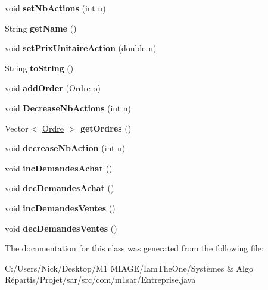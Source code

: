 \begin{DoxyCompactItemize}
void {\bfseries set\+Nb\+Actions} (int n)
\item 
\mbox{\label{classcom_1_1m1sar_1_1_entreprise_af66aed31cdbaff6cefd61c2ec5b9bfe0}} 
String {\bfseries get\+Name} ()
\item 
\mbox{\label{classcom_1_1m1sar_1_1_entreprise_a0ed4009a7c3fc1269173bab119b36b3f}} 
void {\bfseries set\+Prix\+Unitaire\+Action} (double n)
\item 
\mbox{\label{classcom_1_1m1sar_1_1_entreprise_ae1ddae7b447940b42526dc9f4eaceb22}} 
String {\bfseries to\+String} ()
\item 
\mbox{\label{classcom_1_1m1sar_1_1_entreprise_afdd74683ad48edc7c5c2ef7fc7cf93cc}} 
void {\bfseries add\+Order} (\hyperlink{classcom_1_1m1sar_1_1_ordre}{Ordre} o)
\item 
\mbox{\label{classcom_1_1m1sar_1_1_entreprise_a0696f7532e5b4b92e79625d9a180e4df}} 
void {\bfseries Decrease\+Nb\+Actions} (int n)
\item 
\mbox{\label{classcom_1_1m1sar_1_1_entreprise_a7263cbae806b5a15e9ada6319c52de13}} 
Vector$<$ \hyperlink{classcom_1_1m1sar_1_1_ordre}{Ordre} $>$ {\bfseries get\+Ordres} ()
\item 
\mbox{\label{classcom_1_1m1sar_1_1_entreprise_af80280e108d6383f0ce6b788fc1b5316}} 
void {\bfseries decrease\+Nb\+Action} (int n)
\item 
\mbox{\label{classcom_1_1m1sar_1_1_entreprise_a757cb487a04e7efa0c8af693e3fc0eb4}} 
void {\bfseries inc\+Demandes\+Achat} ()
\item 
\mbox{\label{classcom_1_1m1sar_1_1_entreprise_a83287630bd618f01257e26ecf714cca0}} 
void {\bfseries dec\+Demandes\+Achat} ()
\item 
\mbox{\label{classcom_1_1m1sar_1_1_entreprise_a87ee28b2b1413b4fcb1cfeccc79a4d3a}} 
void {\bfseries inc\+Demandes\+Ventes} ()
\item 
\mbox{\label{classcom_1_1m1sar_1_1_entreprise_a9c91ac39ef0a269a450731c94ed2108e}} 
void {\bfseries dec\+Demandes\+Ventes} ()
\end{DoxyCompactItemize}


The documentation for this class was generated from the following file\+:\begin{DoxyCompactItemize}
\item 
C\+:/\+Users/\+Nick/\+Desktop/\+M1 M\+I\+A\+G\+E/\+Iam\+The\+One/\+Systèmes \& Algo Répartis/\+Projet/sar/src/com/m1sar/Entreprise.\+java\end{DoxyCompactItemize}
